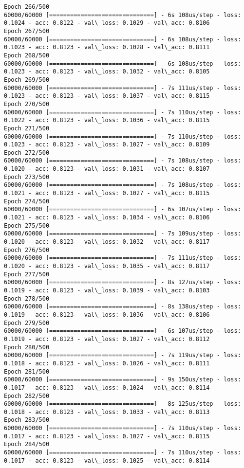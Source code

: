 \documentclass[11pt]{article}
\begin{document}
\begin{Verbatim}[commandchars=\\\{\}]
Epoch 266/500
60000/60000 [==============================] - 6s 108us/step - loss: 0.1024 - acc: 0.8122 - val\_loss: 0.1029 - val\_acc: 0.8106
Epoch 267/500
60000/60000 [==============================] - 6s 108us/step - loss: 0.1023 - acc: 0.8123 - val\_loss: 0.1028 - val\_acc: 0.8111
Epoch 268/500
60000/60000 [==============================] - 6s 108us/step - loss: 0.1023 - acc: 0.8123 - val\_loss: 0.1032 - val\_acc: 0.8105
Epoch 269/500
60000/60000 [==============================] - 7s 111us/step - loss: 0.1023 - acc: 0.8123 - val\_loss: 0.1037 - val\_acc: 0.8115
Epoch 270/500
60000/60000 [==============================] - 7s 110us/step - loss: 0.1022 - acc: 0.8123 - val\_loss: 0.1036 - val\_acc: 0.8115
Epoch 271/500
60000/60000 [==============================] - 7s 110us/step - loss: 0.1023 - acc: 0.8123 - val\_loss: 0.1027 - val\_acc: 0.8109
Epoch 272/500
60000/60000 [==============================] - 7s 108us/step - loss: 0.1020 - acc: 0.8123 - val\_loss: 0.1031 - val\_acc: 0.8107
Epoch 273/500
60000/60000 [==============================] - 7s 108us/step - loss: 0.1021 - acc: 0.8123 - val\_loss: 0.1027 - val\_acc: 0.8115
Epoch 274/500
60000/60000 [==============================] - 6s 107us/step - loss: 0.1021 - acc: 0.8123 - val\_loss: 0.1034 - val\_acc: 0.8106
Epoch 275/500
60000/60000 [==============================] - 7s 109us/step - loss: 0.1020 - acc: 0.8123 - val\_loss: 0.1032 - val\_acc: 0.8117
Epoch 276/500
60000/60000 [==============================] - 7s 111us/step - loss: 0.1020 - acc: 0.8123 - val\_loss: 0.1035 - val\_acc: 0.8117
Epoch 277/500
60000/60000 [==============================] - 8s 127us/step - loss: 0.1019 - acc: 0.8123 - val\_loss: 0.1039 - val\_acc: 0.8103
Epoch 278/500
60000/60000 [==============================] - 8s 138us/step - loss: 0.1019 - acc: 0.8123 - val\_loss: 0.1036 - val\_acc: 0.8106
Epoch 279/500
60000/60000 [==============================] - 6s 107us/step - loss: 0.1019 - acc: 0.8123 - val\_loss: 0.1027 - val\_acc: 0.8112
Epoch 280/500
60000/60000 [==============================] - 7s 119us/step - loss: 0.1018 - acc: 0.8123 - val\_loss: 0.1026 - val\_acc: 0.8111
Epoch 281/500
60000/60000 [==============================] - 9s 150us/step - loss: 0.1017 - acc: 0.8123 - val\_loss: 0.1024 - val\_acc: 0.8114
Epoch 282/500
60000/60000 [==============================] - 8s 125us/step - loss: 0.1018 - acc: 0.8123 - val\_loss: 0.1033 - val\_acc: 0.8113
Epoch 283/500
60000/60000 [==============================] - 7s 110us/step - loss: 0.1017 - acc: 0.8123 - val\_loss: 0.1027 - val\_acc: 0.8115
Epoch 284/500
60000/60000 [==============================] - 7s 110us/step - loss: 0.1017 - acc: 0.8123 - val\_loss: 0.1025 - val\_acc: 0.8114

\end{Verbatim}
\end{document}
